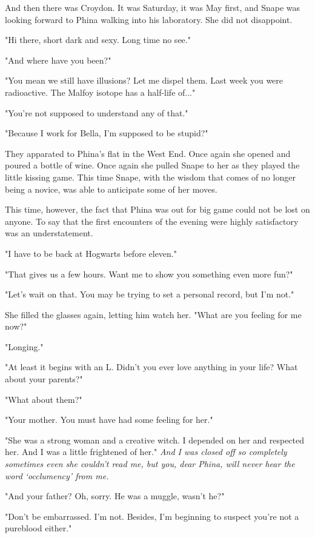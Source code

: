 And then there was Croydon. It was Saturday, it was May first, and Snape was looking forward to Phina walking into his laboratory. She did not disappoint.

"Hi there, short dark and sexy. Long time no see."

"And where have you been?"

"You mean we still have illusions? Let me dispel them. Last week you were radioactive. The Malfoy isotope has a half-life of..."

"You're not supposed to understand any of that."

"Because I work for Bella, I'm supposed to be stupid?"

They apparated to Phina's flat in the West End. Once again she opened and poured a bottle of wine. Once again she pulled Snape to her as they played the little kissing game. This time Snape, with the wisdom that comes of no longer being a novice, was able to anticipate some of her moves.

This time, however, the fact that Phina was out for big game could not be lost on anyone. To say that the first encounters of the evening were highly satisfactory was an understatement.

"I have to be back at Hogwarts before eleven."

"That gives us a few hours. Want me to show you something even more fun?"

"Let's wait on that. You may be trying to set a personal record, but I'm not."

She filled the glasses again, letting him watch her. "What are you feeling for me now?"

"Longing."

"At least it begins with an L. Didn't you ever love anything in your life? What about your parents?"

"What about them?"

"Your mother. You must have had some feeling for her."

"She was a strong woman and a creative witch. I depended on her and respected her. And I was a little frightened of her." \emph{And I was closed off so completely sometimes even she couldn't read me, but you, dear Phina, will never hear the word `occlumency' from me.}

"And your father? Oh, sorry. He was a muggle, wasn't he?"

"Don't be embarrassed. I'm not. Besides, I'm beginning to suspect you're not a pureblood either."

